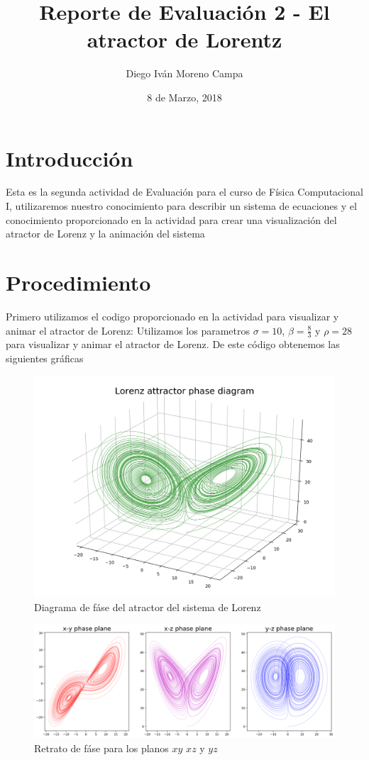 \documentclass{article}
\title{Reporte de Evaluación 2 - El atractor de Lorentz}
\author{Diego Iván Moreno Campa}
\date{8 de Marzo, 2018}
\begin{document}
\maketitle

\bigskip

\section{Introducción}

Esta es la segunda actividad de Evaluación para el curso de Física Computacional I, utilizaremos nuestro conocimiento para describir un sistema de ecuaciones y el conocimiento proporcionado en la actividad para crear una visualización del atractor de Lorenz y la animación del sistema

\section{Procedimiento}

Primero utilizamos el codigo proporcionado en la actividad para visualizar y animar el atractor de Lorenz:
Utilizamos los parametros $\sigma=10$, $\beta=\frac{8}{3}$ y $\rho=28$ para visualizar y animar el atractor de Lorenz. De este código obtenemos las siguientes gráficas
\begin{figure}[ht!]
\centering
\includegraphics[width=0.5\linewidth]{ej1-pd.png}
\caption{Diagrama de fáse del atractor del sistema de Lorenz}
\end{figure}

\begin{figure}[ht!]
\centering
\includegraphics[width=\linewidth]{ej1-pp.png}
\caption{Retrato de fáse para los planos $xy$ $xz$ y $yz$}
\end{figure}
\end{document}
